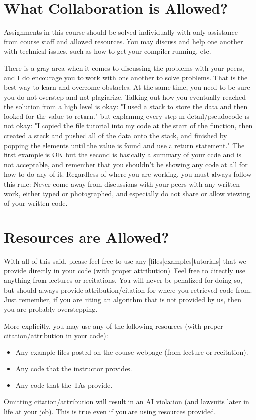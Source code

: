 \documentclass{article}
\begin{document}
\section{What Collaboration is Allowed?}
Assignments in this course should be solved individually with only assistance from course staff and allowed resources. You may discuss and help one another with technical issues, such as how to get your compiler running, etc.

There is a gray area when it comes to discussing the problems with your peers, and I do encourage you to work with one another to solve problems. That is the best way to learn and overcome obstacles. At the same time, you need to be sure you do not overstep and not plagiarize. Talking out how you eventually reached the solution from a high level is okay: "I used a stack to store the data and then looked for the value to return." but explaining every step in detail/pseudocode is not okay: "I copied the file tutorial into my code at the start of the function, then created a stack and pushed all of the data onto the stack, and finished by popping the elements until the value is found and use a return statement." The first example is OK but the second is basically a summary of your code and is not acceptable, and remember that you shouldn’t be showing any code at all for how to do any of it. Regardless of where you are working, you must always follow this rule: Never come away from discussions with your peers with any written work, either typed or photographed, and especially do not share or allow viewing of your written code.

\section{Resources are Allowed?}
With all of this said, please feel free to use any [files|examples|tutorials] that we provide directly in your code (with proper attribution). Feel free to directly use anything from lectures or recitations. You will never be penalized for doing so, but should always provide attribution/citation for where you retrieved code from. Just remember, if you are citing an algorithm that is not provided by us, then you are probably overstepping.

More explicitly, you may use any of the following resources (with proper citation/attribution in your code):
\begin{itemize}
    \item Any example files posted on the course webpage (from lecture or recitation).
    \item Any code that the instructor provides.
    \item Any code that the TAs provide.
\end{itemize}
Omitting citation/attribution will result in an AI violation (and lawsuits later in life at your job). This is true even if you are using resources provided.
\end{document}
